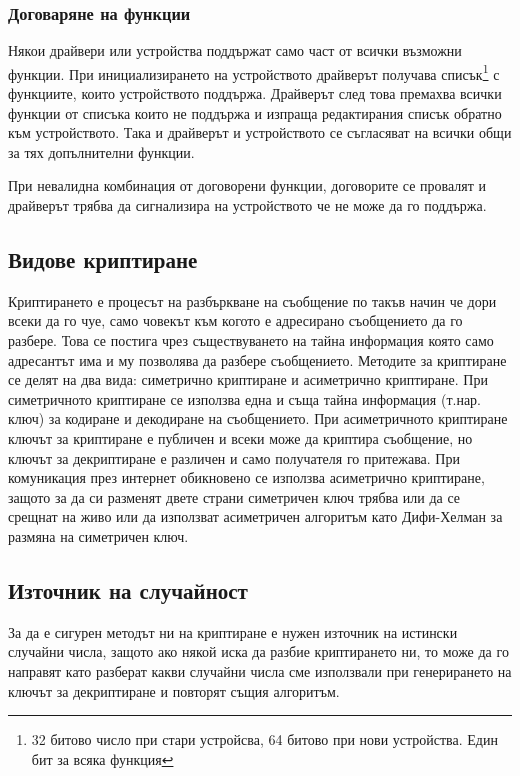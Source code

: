 \subsubsection{Договаряне на функции}
Някои драйвери или устройства поддържат само част от всички възможни функции. При инициализирането на устройството драйверът получава списък\footnote{32 битово число при стари устройсва, 64 битово при нови устройства. Един бит за всяка функция} с функциите, които устройството поддържа. Драйверът след това премахва всички функции от списъка които не поддържа и изпраща редактирания списък обратно към устройството. Така и драйверът и устройството се съгласяват на всички общи за тях допълнителни функции.

При невалидна комбинация от договорени функции, договорите се провалят и драйверът трябва да сигнализира на устройството че не може да го поддържа.

\subsection{Видове криптиране}
Криптирането е процесът на разбъркване на съобщение по такъв начин че дори всеки да го чуе, само човекът към когото е адресирано съобщението да го разбере. Това се постига чрез съществуването на тайна информация която само адресантът има и му позволява да разбере съобщението. Методите за криптиране се делят на два вида: симетрично криптиране и асиметрично криптиране. При симетричното криптиране се използва една и съща тайна информация (т.нар. ключ) за кодиране и декодиране на съобщението. При асиметричното криптиране ключът за криптиране е публичен и всеки може да криптира съобщение, но ключът за декриптиране е различен и само получателя го притежава. При комуникация през интернет обикновено се използва асиметрично криптиране, защото за да си разменят двете страни симетричен ключ трябва или да се срещнат на живо или да използват асиметричен алгоритъм като Дифи-Хелман за размяна на симетричен ключ.

\subsection{Източник на случайност}
За да е сигурен методът ни на криптиране е нужен източник на истински случайни числа, защото ако някой иска да разбие криптирането ни, то може да го направят като разберат какви случайни числа сме използвали при генерирането на ключът за декриптиране и повторят същия алгоритъм.

